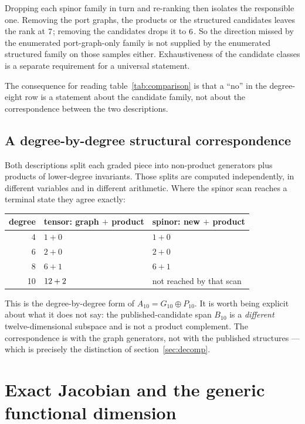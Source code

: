 \documentclass[11pt,a4paper]{article}
\begin{document}
Dropping each spinor family in turn and re-ranking then isolates the
responsible one. Removing the port graphs, the products or the structured
candidates leaves the rank at $7$; removing the
\dEightIndispensable{} candidates drops it to $6$. So the
direction missed by the enumerated port-graph-only family is not supplied
by the enumerated structured family on those samples either. Exhaustiveness
of the candidate classes is a separate requirement for a universal statement.

The consequence for reading table~\ref{tab:comparison} is that a ``no'' in the
degree-eight row is a statement about the candidate family, not about the
correspondence between the two descriptions.

\subsection{A degree-by-degree structural correspondence}

Both descriptions split each graded piece into non-product generators plus
products of lower-degree invariants. Those splits are computed independently, in
different variables and in different arithmetic. Where the spinor scan reaches a
terminal state they agree exactly:

\begin{center}
\begin{tabular}{rll}
\toprule
degree & tensor: graph $+$ product & spinor: new $+$ product \\
\midrule
4 & $1 + 0$ & $1 + 0$ \\
6 & $2 + 0$ & $2 + 0$ \\
8 & $6 + 1$ & $6 + 1$ \\
10 & $12 + 2$ & not reached by that scan \\
\bottomrule
\end{tabular}
\end{center}

This is the degree-by-degree form of $A_{10} = G_{10}\oplus P_{10}$. It is worth
being explicit about what it does not say: the published-candidate span $B_{10}$
is a \emph{different} twelve-dimensional subspace and is not a product
complement. The correspondence is with the graph generators, not with the
published structures --- which is precisely the distinction of
section~\ref{sec:decomp}.

\section{Exact Jacobian and the generic functional dimension}
\label{sec:jacobian}
\end{document}

